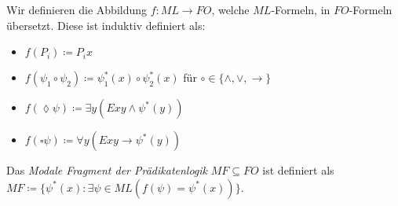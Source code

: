\begin{definition}
	Wir definieren die Abbildung $f:ML\to FO$, welche $ML$-Formeln, in $FO$-Formeln übersetzt. Diese ist induktiv definiert als:
	\begin{itemize}
		\item $f(P_i)\coloneqq P_i x$
		\item $f(\psi_1\circ \psi_2)\coloneqq \psi_1^\ast(x)\circ\psi_2^\ast(x)$ für $\circ\in\{\land,\lor,\rightarrow\}$
		\item $f(\lozenge\psi)\coloneqq\exists y (Exy \land \psi^\ast(y))$
		\item $f(\square\psi) \coloneqq \forall y (Exy\rightarrow \psi^\ast(y))$
	\end{itemize}
	Das \textit{Modale Fragment der Prädikatenlogik} $MF\subseteq FO$ ist definiert als $MF\coloneqq\{\psi^\ast(x) : \exists \psi\in ML (f(\psi)=\psi^\ast(x)) \}$.
\end{definition}

